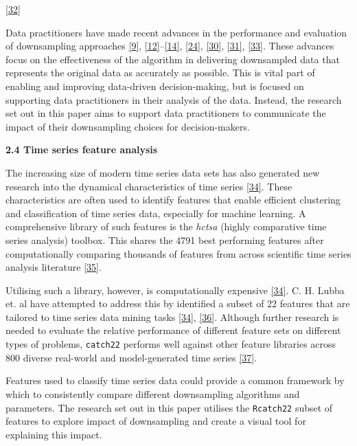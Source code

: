 \documentclass{article}
\begin{document}
\protect\hyperlink{ref-M4}{{[}32{]}}

Data practitioners have made recent advances in the performance and
evaluation of downsampling approaches
\protect\hyperlink{ref-datapoint}{{[}9{]}},
\protect\hyperlink{ref-downsampling}{{[}12{]}}--\protect\hyperlink{ref-MinMaxLTTB}{{[}14{]}},
\protect\hyperlink{ref-plotly}{{[}24{]}},
\protect\hyperlink{ref-dashql}{{[}30{]}},
\protect\hyperlink{ref-EveryNth}{{[}31{]}},
\protect\hyperlink{ref-MinMaxOrdered}{{[}33{]}}. These advances focus on
the effectiveness of the algorithm in delivering downsampled data that
represents the original data as accurately as possible. This is vital
part of enabling and improving data-driven decision-making, but is
focused on supporting data practitioners in their analysis of the data.
Instead, the research set out in this paper aims to support data
practitioners to communicate the impact of their downsampling choices
for decision-makers.

\textbf{2.4 Time series feature analysis}

The increasing size of modern time series data sets has also generated
new research into the dynamical characteristics of time series
\protect\hyperlink{ref-catch22}{{[}34{]}}. These characteristics are
often used to identify features that enable efficient clustering and
classification of time series data, especially for machine learning. A
comprehensive library of such features is the \emph{hctsa} (highly
comparative time series analysis) toolbox. This shares the 4791 best
performing features after computationally comparing thousands of
features from across scientific time series analysis literature
\protect\hyperlink{ref-fulcher2017}{{[}35{]}}.

Utilising such a library, however, is computationally expensive
\protect\hyperlink{ref-catch22}{{[}34{]}}. C. H. Lubba et. al have
attempted to address this by identified a subset of 22 features that are
tailored to time series data mining tasks
\protect\hyperlink{ref-catch22}{{[}34{]}},
\protect\hyperlink{ref-bagnall}{{[}36{]}}. Although further research is
needed to evaluate the relative performance of different feature sets on
different types of problems, \texttt{catch22} performs well against
other feature libraries across 800 diverse real-world and
model-generated time series \protect\hyperlink{ref-henderson}{{[}37{]}}.

Features used to classify time series data could provide a common
framework by which to consistently compare different downsampling
algorithms and parameters. The research set out in this paper utilises
the \texttt{Rcatch22} subset of features to explore impact of
downsampling and create a visual tool for explaining this impact.
\end{document}

